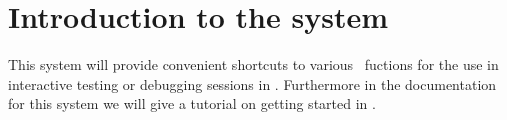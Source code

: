 \section{Introduction to the system}

This system will provide convenient shortcuts to various \keim\ fuctions for the use in interactive testing or
debugging sessions in \keim. Furthermore in the documentation for this system we will give a tutorial on
getting started in \keim.
